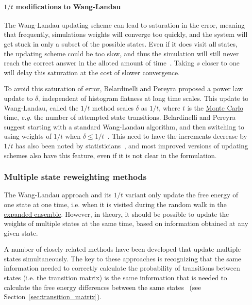 \documentclass[9pt,review]{livecoms}
\begin{document}
\paragraph{$1/t$ modifications to Wang-Landau}
The Wang-Landau updating scheme can lead to saturation in the error,
meaning that frequently, simulations weights will converge too quickly, and the system will get stuck in only a subset of the possible states.  Even if it does visit all states, the updating scheme could be too slow, and thus the simulation will still  never reach the correct answer in the alloted amount of time~\cite{Belardinelli2007, Belardinelli2008}.  Taking $s$ closer to one will delay this saturation at the cost of slower convergence.

To avoid this saturation of error, Belardinelli and Pereyra proposed a
power law update to $\delta$, independent of histogram flatness at
long time scales. This update to Wang-Landau, called the $1/t$ method
scales $\delta$ as $1/t$, where $t$ is the \hyperlink{ref:MetropolisMonteCarlo} {Monte Carlo} time, \textit{e.g.} the
number of attempted state transitions.  Belardinelli and Pereyra
suggest starting with a standard Wang-Landau algorithm, and then
switching to using weights of $1/t$ when $\delta \leq 1/t$~\cite{Belardinelli2008, Belardinelli2007}. This need to have the increments decrease by $1/t$ has also been noted by statisticians~\cite{wl_convergence}, and most improved versions of updating schemes also have this feature, even if it is not clear in the formulation.

\subsubsection{\label{sec:multiplestatemethods}Multiple state reweighting methods}

The Wang-Landau approach and its $1/t$ variant only update the free energy of one state at one time, i.e. when it is visited during the random walk in the \hyperlink{ref:ExpEns} {expanded ensemble}.  However, in theory, it should be possible to update the weights of multiple states at the same time, based on information obtained at any given state.

A number of closely related methods have been developed that update multiple states simultaneously. The key to these approaches is recognizing that the same information needed to correctly calculate the probability of  transitions between states (i.e. the transition matrix) is the same information that is needed to calculate the free energy differences between the same states~\cite{escobedo_transition_2006,Wang:JoSP:2002} (see Section~\ref{sec:transition_matrix}).
\end{document}
